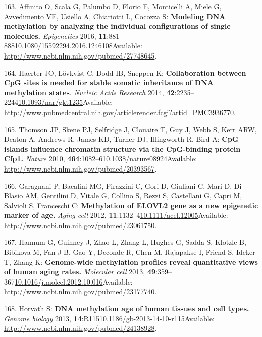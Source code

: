 \documentclass[
]{book}
\begin{document}
\leavevmode\hypertarget{ref-Affinito2016}{}%
163. Affinito O, Scala G, Palumbo D, Florio E, Monticelli A, Miele G, Avvedimento VE, Usiello A, Chiariotti L, Cocozza S: \textbf{Modeling DNA methylation by analyzing the individual configurations of single molecules.} \emph{Epigenetics} 2016, \textbf{11}:881--888\href{https://doi.org/10.1080/15592294.2016.1246108}{10.1080/15592294.2016.1246108}Available: \url{http://www.ncbi.nlm.nih.gov/pubmed/27748645}.

\leavevmode\hypertarget{ref-Haerter2014}{}%
164. Haerter JO, Lövkvist C, Dodd IB, Sneppen K: \textbf{Collaboration between CpG sites is needed for stable somatic inheritance of DNA methylation states}. \emph{Nucleic Acids Research} 2014, \textbf{42}:2235--2244\href{https://doi.org/10.1093/nar/gkt1235}{10.1093/nar/gkt1235}Available: \url{http://www.pubmedcentral.nih.gov/articlerender.fcgi?artid=PMC3936770}.

\leavevmode\hypertarget{ref-Thomson2010}{}%
165. Thomson JP, Skene PJ, Selfridge J, Clouaire T, Guy J, Webb S, Kerr ARW, Deaton A, Andrews R, James KD, Turner DJ, Illingworth R, Bird A: \textbf{CpG islands influence chromatin structure via the CpG-binding protein Cfp1.} \emph{Nature} 2010, \textbf{464}:1082--6\href{https://doi.org/10.1038/nature08924}{10.1038/nature08924}Available: \url{http://www.ncbi.nlm.nih.gov/pubmed/20393567}.

\leavevmode\hypertarget{ref-Garagnani2012}{}%
166. Garagnani P, Bacalini MG, Pirazzini C, Gori D, Giuliani C, Mari D, Di Blasio AM, Gentilini D, Vitale G, Collino S, Rezzi S, Castellani G, Capri M, Salvioli S, Franceschi C: \textbf{Methylation of ELOVL2 gene as a new epigenetic marker of age.} \emph{Aging cell} 2012, \textbf{11}:1132--4\href{https://doi.org/10.1111/acel.12005}{10.1111/acel.12005}Available: \url{http://www.ncbi.nlm.nih.gov/pubmed/23061750}.

\leavevmode\hypertarget{ref-Hannum2013}{}%
167. Hannum G, Guinney J, Zhao L, Zhang L, Hughes G, Sadda S, Klotzle B, Bibikova M, Fan J-B, Gao Y, Deconde R, Chen M, Rajapakse I, Friend S, Ideker T, Zhang K: \textbf{Genome-wide methylation profiles reveal quantitative views of human aging rates.} \emph{Molecular cell} 2013, \textbf{49}:359--367\href{https://doi.org/10.1016/j.molcel.2012.10.016}{10.1016/j.molcel.2012.10.016}Available: \url{http://www.ncbi.nlm.nih.gov/pubmed/23177740}.

\leavevmode\hypertarget{ref-Horvath2013}{}%
168. Horvath S: \textbf{DNA methylation age of human tissues and cell types.} \emph{Genome biology} 2013, \textbf{14}:R115\href{https://doi.org/10.1186/gb-2013-14-10-r115}{10.1186/gb-2013-14-10-r115}Available: \url{http://www.ncbi.nlm.nih.gov/pubmed/24138928}.
\end{document}
